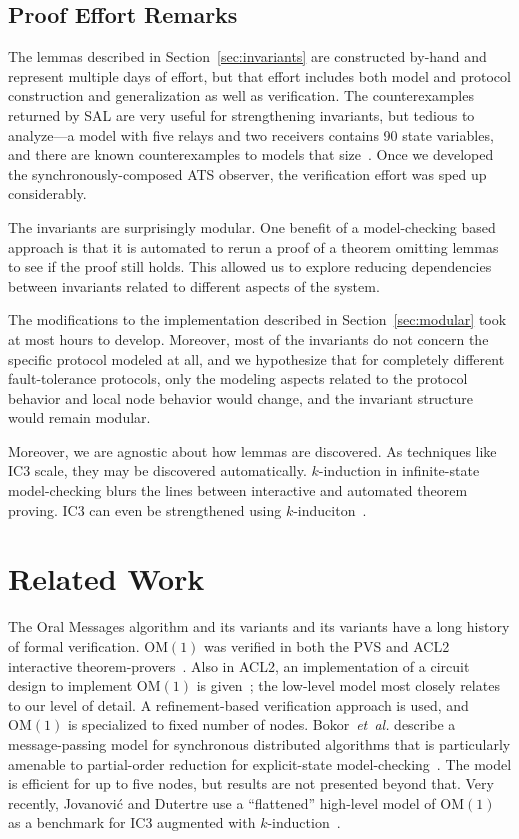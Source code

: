 \documentclass{llncs/llncs}
\newcommand{\OM}[1]{\ensuremath{\mathrm{OM}(#1)}\xspace}
\begin{document}
{\subsection{Proof Effort Remarks}

The lemmas described in Section~\ref{sec:invariants} are constructed by-hand and represent multiple days of effort, but that effort includes both model and protocol construction and generalization as well as verification. The counterexamples returned by SAL are very useful for strengthening invariants, but tedious to analyze---a model with five relays and two receivers contains 90 state variables, and there are known counterexamples to models that size~\cite{Lincoln-Rushby}. Once we developed the synchronously-composed ATS observer, the verification effort was sped up considerably.

The invariants are surprisingly modular. One benefit of a model-checking based approach is that it is automated to rerun a proof of a theorem omitting lemmas to see if the proof still holds. This allowed us to explore reducing dependencies between invariants related to different aspects of the system.

The modifications to the implementation described in Section~\ref{sec:modular} took at most hours to develop. Moreover, most of the invariants do not concern the specific protocol modeled at all, and we hypothesize that for completely different fault-tolerance protocols, only the modeling aspects related to the protocol behavior and local node behavior would change, and the invariant structure would remain modular.

Moreover, we are agnostic about how lemmas are discovered. As techniques like IC3 scale, they may be discovered automatically. $k$-induction in infinite-state model-checking blurs the lines between interactive and automated theorem proving. IC3 can even be strengthened using $k$-induciton~\cite{pdr-kind}. %

\section{Related Work}\label{sec:related}

The Oral Messages algorithm and its variants and its variants have a long history of formal verification. \OM{1} was verified in both the PVS and ACL2 interactive theorem-provers~\cite{Young97:IC}. Also in ACL2, an implementation of a circuit design to implement \OM{1} is given~\cite{om-acl2-impl}; the low-level model most closely relates to our level of detail. A refinement-based verification approach is used, and \OM{1} is specialized to fixed number of nodes. Bokor~\emph{et~al.} describe a message-passing model for synchronous distributed algorithms that is particularly amenable to partial-order reduction for explicit-state model-checking~\cite{Bokor2010}. The model is efficient for up to five nodes, but results are not presented beyond that. Very recently, Jovanovi{\'{c}} and Dutertre use a ``flattened'' high-level model of \OM{1} as a benchmark for IC3 augmented with $k$-induction~\cite{pdr-kind}.

}
\end{document}
